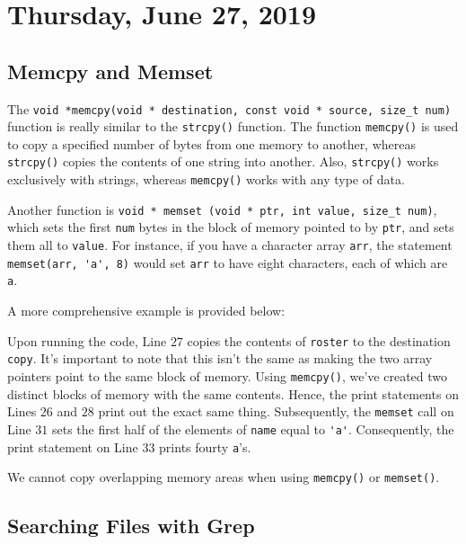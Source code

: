 \section{Thursday, June 27, 2019}
\subsection{Memcpy and Memset}
The \verb!void *memcpy(void * destination, const void * source, size_t num)! function is really similar to the \verb!strcpy()! function. The function \verb!memcpy()! is used to copy a specified number of bytes from one memory to another, whereas \verb!strcpy()! copies the contents of one string into another. Also, \verb!strcpy()! works exclusively with strings, whereas \verb!memcpy()! works with any type of data.


Another function is \verb!void * memset (void * ptr, int value, size_t num)!, which sets the first \verb!num! bytes in the block of memory pointed to by \verb!ptr!, and sets them all to \verb!value!. For instance, if you have a character array \verb!arr!, the statement \verb!memset(arr, 'a', 8)! would set \verb!arr! to have eight characters, each of which are \verb!a!.

A more comprehensive example is provided below:
    
    \lstset{
    caption=Memset and Memcpy}
    \begin{center}
    \label{Memset and Memcpy}
    \end{center}
    
    
    

Upon running the code, Line $27$ copies the contents of \verb!roster! to the destination \verb!copy!. It's important to note that this isn't the same as making the two array pointers point to the same block of memory. Using \verb!memcpy()!, we've created two distinct blocks of memory with the same contents. Hence, the print statements on Lines $26$ and $28$ print out the exact same thing. Subsequently, the \verb!memset! call on Line $31$ sets the first half of the elements of \verb!name! equal to \verb!'a'!. Consequently, the print statement on Line $33$ prints fourty \verb!a!'s.


We cannot copy overlapping memory areas when using \verb!memcpy()! or \verb!memset()!.  


\subsection{Searching Files with Grep}

